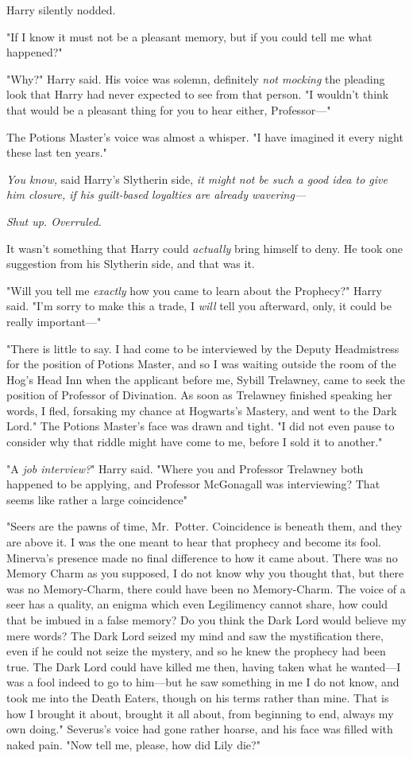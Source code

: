 Harry silently nodded.

"If{\el} I know it must not be a pleasant memory, but{\el} if you could
tell me what happened{\el}?"

"Why?" Harry said. His voice was solemn, definitely \emph{not mocking} the
pleading look that Harry had never expected to see from that person. "I
wouldn't think that would be a pleasant thing for you to hear either,
Professor—"

The Potions Master's voice was almost a whisper. "I have imagined it every
night these last ten years."

\emph{You know,} said Harry's Slytherin side, \emph{it might not be such a good
idea to give him closure, if his guilt-based loyalties are already wavering—}

\emph{Shut up. Overruled.}

It wasn't something that Harry could \emph{actually} bring himself to deny. He
took one suggestion from his Slytherin side, and that was it.

"Will you tell me \emph{exactly} how you came to learn about the Prophecy?"
Harry said. "I'm sorry to make this a trade, I \emph{will} tell you afterward,
only, it could be really important—"

"There is little to say. I had come to be interviewed by the Deputy
Headmistress for the position of Potions Master, and so I was waiting outside
the room of the Hog's Head Inn when the applicant before me, Sybill Trelawney,
came to seek the position of Professor of Divination. As soon as Trelawney
finished speaking her words, I fled, forsaking my chance at Hogwarts's Mastery,
and went to the Dark Lord." The Potions Master's face was drawn and tight. "I
did not even pause to consider why that riddle might have come to me, before I
sold it to another."

"A \emph{job interview?}" Harry said. "Where you and Professor Trelawney both
happened to be applying, and Professor McGonagall was interviewing? That
seems{\el} like rather a large coincidence{\el}"

"Seers are the pawns of time, Mr.~Potter. Coincidence is beneath them, and they
are above it. I was the one meant to hear that prophecy and become its fool.
Minerva's presence made no final difference to how it came about. There was no
Memory Charm as you supposed, I do not know why you thought that, but there was
no Memory-Charm, there could have been no Memory-Charm. The voice of a seer has
a quality, an enigma which even Legilimency cannot share, how could that be
imbued in a false memory? Do you think the Dark Lord would believe my mere
words? The Dark Lord seized my mind and saw the mystification there, even if he
could not seize the mystery, and so he knew the prophecy had been true. The
Dark Lord could have killed me then, having taken what he wanted—I was a fool
indeed to go to him—but he saw something in me I do not know, and took me
into the Death Eaters, though on his terms rather than mine. That is how I
brought it about, brought it all about, from beginning to end, always my own
doing." Severus's voice had gone rather hoarse, and his face was filled with
naked pain. "Now tell me, please, how did Lily die?"


